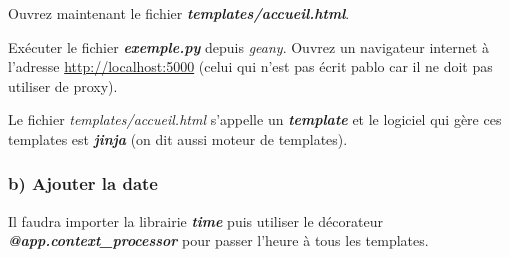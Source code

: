 \documentclass{article}
\newenvironment{Shaded}{}{}
\newcommand{\KeywordTok}[1]{\textcolor[rgb]{0.00,0.44,0.13}{\textbf{{#1}}}}
\newcommand{\DataTypeTok}[1]{\textcolor[rgb]{0.56,0.13,0.00}{{#1}}}
\newcommand{\StringTok}[1]{\textcolor[rgb]{0.25,0.44,0.63}{{#1}}}
\newcommand{\CommentTok}[1]{\textcolor[rgb]{0.38,0.63,0.69}{\textit{{#1}}}}
\newcommand{\OtherTok}[1]{\textcolor[rgb]{0.00,0.44,0.13}{{#1}}}
\newcommand{\NormalTok}[1]{{#1}}
\begin{document}
Ouvrez maintenant le fichier \textbf{\emph{templates/accueil.html}}.

\begin{Shaded}
\end{Shaded}

Exécuter le fichier \textbf{\emph{exemple.py}} depuis \emph{geany}.
Ouvrez un navigateur internet à l'adresse \url{http://localhost:5000}
(celui qui n'est pas écrit pablo car il ne doit pas utiliser de proxy).

Le fichier \emph{templates/accueil.html} s'appelle un
\textbf{\emph{template}} et le logiciel qui gère ces templates est
\textbf{\emph{jinja}} (on dit aussi moteur de templates).

    \subsubsection{b) Ajouter la date}\label{b-ajouter-la-date}

Il faudra importer la librairie \textbf{\emph{time}} puis utiliser le
décorateur \textbf{\emph{@app.context\_processor}} pour passer l'heure à
tous les templates.
\end{document}

